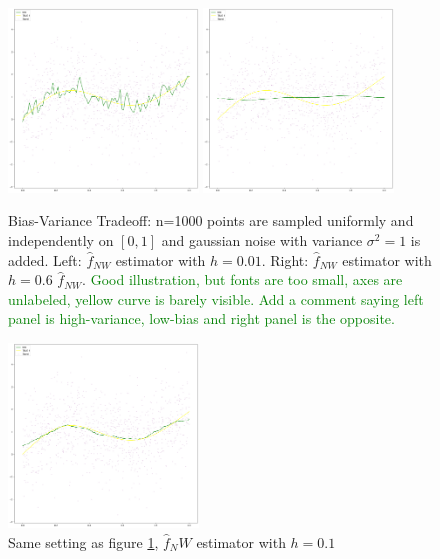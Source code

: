 \documentclass{article}
\newcommand\SB[1]{\textcolor{green}{#1}}
\begin{document}
\begin{figure}
    \centering
    \includegraphics[width=0.45\textwidth]{low_bias_001.png}
    \includegraphics[width=0.45\textwidth]{low_variance_06.png}
    \caption{Bias-Variance Tradeoff: n=1000 points are sampled uniformly and
      independently on $[0,1]$ and gaussian noise with variance $\sigma^2=1$ is
      added. Left: $\hat{f}_{NW}$ estimator with $h=0.01$. Right: $\hat{f}_{NW}$
      estimator with $h=0.6$ $\hat{f}_{NW}$. \SB{Good illustration, but fonts
        are too small, axes are unlabeled, yellow curve is barely visible. Add a
      comment saying left panel is high-variance, low-bias and right panel is
      the opposite.}
 }
    \label{fig_nw_sensitivity}
\end{figure}

\begin{figure}
    \centering
    \includegraphics[width=0.45\textwidth]{bias_variance_tradeof_01.png}
    \caption{Same setting as figure \ref{fig_nw_sensitivity}, $\hat{f}_NW$ estimator with $h=0.1$}
    \label{fig_nw_bias_var_tradeoff}
\end{figure}
\end{document}
